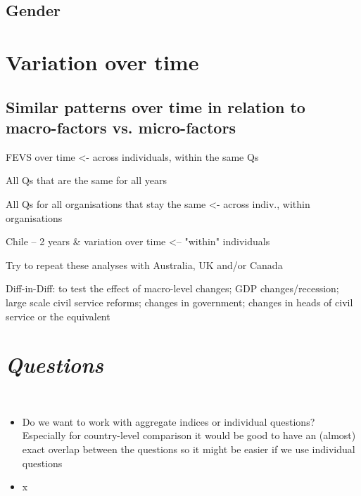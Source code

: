 \documentclass{article}
\begin{document}
\subsection{Gender}


\section{Variation over time}
\subsection{Similar patterns over time in relation to macro-factors vs. micro-factors}
\item FEVS over time <- across individuals, within the same Qs
    \item All Qs that are the same for all years
    \item All Qs for all organisations that stay the same <- across indiv., within organisations
\item Chile -- 2 years & variation over time <--   "within" individuals
\item Try to repeat these analyses with Australia, UK and/or Canada
\item Diff-in-Diff: to test the effect of macro-level changes; GDP changes/recession; large scale civil service reforms; changes in government; changes in heads of civil service or the equivalent 


\newpage

\section{\textit{Questions}}\\[0.5in]

\begin{itemize}
    \item Do we want to work with aggregate indices or individual questions? Especially for country-level comparison it would be good to have an (almost) exact overlap between the questions so it might be easier if we use individual questions\\
    \item x

\end{itemize}


\clearpage



\end{document}
